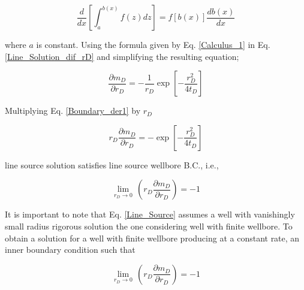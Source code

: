 \documentclass{llncs}
\numberwithin{equation}{section}
\numberwithin{figure}{section}
\numberwithin{table}{section}
\begin{document}

    \begin{equation}
    \frac{d}{dx}\left[ \int_{a}^{b\left( x \right)}{f\left( z \right)dz} \right]=f\left[ b\left( x \right) \right]\frac{db\left( x \right)}{dx}
        \label{Calculus_1}
    \end{equation}

    where $a$ is constant. Using the formula given by Eq. \ref{Calculus_1} in Eq. \ref{Line_Solution_dif_rD} and simplifying the resulting equation; 

    \begin{equation}
    \frac{\partial {{ m }_{D}}}{\partial {{r}_{D}}}=-\frac{1}{{{r}_{D}}}\exp \left[ -\frac{r_{D}^{2}}{4{{t}_{D}}} \right]
        \label{Boundary_der1}
    \end{equation}

    Multiplying Eq. \ref{Boundary_der1} by $r_{D}$

    \begin{equation}
    {{r}_{D}}\frac{\partial {{ m }_{D}}}{\partial {{r}_{D}}}=-\exp \left[ -\frac{r_{D}^{2}}{4{{t}_{D}}} \right]
        \label{Boundary_der2}
    \end{equation}

     line source solution satisfies  line source wellbore B.C., i.e.,

    \begin{equation*}
        \underset{{{r}_{D}}\to 0}{\mathop{\lim }}\,\left( {{r}_{D}}\frac{\partial {{m}_{D}}}{\partial {{r}_{D}}} \right)=-1
    \end{equation*}

    It is important to note that Eq. \ref{Line_Source} assumes  a well with vanishingly small radius rigorous solution  the one considering  well with finite wellbore. To obtain a solution for a well with finite wellbore producing at a constant rate, an inner boundary condition  such that

    \begin{equation}
        \underset{{{r}_{D}}\to 0}{\mathop{\lim }}\,\left( {{r}_{D}}\frac{\partial {{m}_{D}}}{\partial {{r}_{D}}} \right)=-1
        \label{Inner_Boundary1}
    \end{equation}
\end{document}

